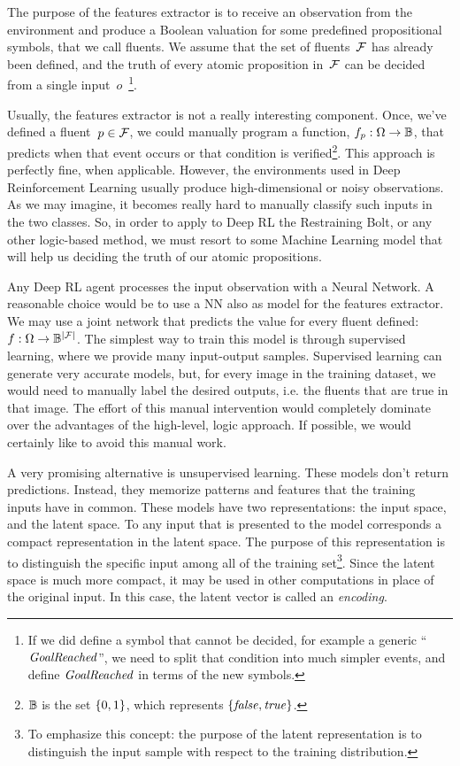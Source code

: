The purpose of the features extractor is to receive an observation from the
environment and produce a Boolean valuation for some predefined propositional
symbols, that we call fluents. We assume that the set of fluents~$\mathcal{F}$
has already been defined, and the truth of every atomic proposition
in~$\mathcal{F}$ can be decided from a single input~$o$~\footnote{If we did
define a symbol that cannot be decided, for example a generic
``$\text{\textit{GoalReached}}$'', we need to split that condition into much simpler
events, and define $\text{\textit{GoalReached}}$ in terms of the new symbols.}.

Usually, the features extractor is not a really interesting component. Once,
we've defined a fluent~$p \in \mathcal{F}$, we could manually program a function,
$f_p: \Omega \to \mathbb{B}$, that predicts when that event occurs or that condition is
verified\footnote{$\mathbb{B}$ is the set $\{0, 1\}$, which represents $\{\text{\textit{false}},
\text{\textit{true}}\}$.}.  This approach is perfectly fine, when applicable.  However, the
environments used in Deep Reinforcement Learning usually produce
high-dimensional or noisy observations. As we may imagine, it becomes really
hard to manually classify such inputs in the two classes. So, in order to
apply to Deep RL the Restraining Bolt, or any other logic-based method, we
must resort to some Machine Learning model that will help us deciding the
truth of our atomic propositions.

Any Deep RL agent processes the input observation with a Neural Network. A
reasonable choice would be to use a NN also as model for the features
extractor. We may use a joint network that predicts the value for every fluent
defined: $f: \Omega \to \mathbb{B}^{\lvert\mathcal{F}\rvert}$. The simplest way to train this
model is through supervised learning, where we provide many input-output
samples. Supervised learning can generate very accurate models, but, for every
image in the training dataset, we would need to manually label the desired
outputs, i.e. the fluents that are true in that image. The effort of this
manual intervention would completely dominate over the advantages of the
high-level, logic approach. If possible, we would certainly like to avoid this
manual work. 

A very promising alternative is unsupervised learning. These models don't
return predictions. Instead, they memorize patterns and features that the
training inputs have in common. These models have two representations: the
input space, and the latent space. To any input that is presented to the
model corresponds a compact representation in the latent space. The purpose
of this representation is to distinguish the specific input among all of the
training set\footnote{To emphasize this concept: the purpose of the latent
representation is to distinguish the input sample with respect to the training
distribution.}. Since the latent space is much more compact, it may be used in
other computations in place of the original input. In this case, the latent
vector is called an \emph{encoding}.

